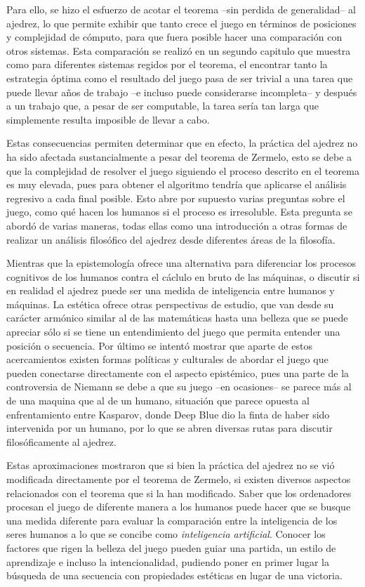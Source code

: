 \documentclass[twoside,openright,12pt,a4paper,spanish]{book}
\begin{document}
Para ello, se hizo el esfuerzo de acotar el teorema --sin perdida de generalidad-- al ajedrez, lo que permite exhibir que tanto crece el juego en t\'erminos de posiciones y complejidad de c\'omputo, para que fuera posible hacer una comparaci\'on con otros sistemas. Esta comparaci\'on se realiz\'o en un segundo capitulo que muestra como para diferentes sistemas regidos por el teorema, el encontrar tanto la estrategia \'optima como el resultado del juego pasa de ser trivial a una tarea que puede llevar a\~nos de trabajo --e incluso puede considerarse incompleta-- y despu\'es a un trabajo que, a pesar de ser computable, la tarea ser\'ia tan larga que simplemente resulta imposible de llevar a cabo.

Estas consecuencias permiten determinar que en efecto, la pr\'actica del ajedrez no ha sido afectada sustancialmente a pesar del teorema de Zermelo, esto se debe a que la complejidad de resolver el juego siguiendo el proceso descrito en el teorema es muy elevada, pues para obtener el algoritmo tendría que aplicarse el análisis regresivo a cada final posible. Esto abre por supuesto varias preguntas sobre el juego, como qu\'e hacen los humanos si el proceso es irresoluble. Esta pregunta se abord\'o de varias maneras, todas ellas como una introducci\'on a otras formas de realizar un an\'alisis filos\'ofico del ajedrez desde diferentes \'areas de la filosof\'ia.

Mientras que la epistemolog\'ia ofrece una alternativa para diferenciar los procesos cognitivos de los humanos contra el c\'aclulo en bruto de las máquinas, o discutir si en realidad el ajedrez puede ser una medida de inteligencia entre humanos y máquinas. La est\'etica ofrece otras perspectivas de estudio, que van desde su car\'acter arm\'onico similar al de las matem\'aticas hasta una belleza que se puede apreciar s\'olo si se tiene un entendimiento del juego que permita entender una posici\'on o secuencia. Por \'ultimo se intent\'o mostrar que aparte de estos acercamientos existen formas pol\'iticas y culturales de abordar el juego que pueden conectarse directamente con el aspecto epist\'emico, pues una parte de la controversia de Niemann se debe a que su juego --en ocasiones-- se parece m\'as al de una maquina que al de un humano, situaci\'on que parece opuesta al enfrentamiento entre Kasparov, donde Deep Blue dio la finta de haber sido intervenida por un humano, por lo que se abren diversas rutas para discutir filos\'oficamente al ajedrez.

Estas aproximaciones mostraron que si bien la pr\'actica del ajedrez no se vi\'o modificada directamente por el teorema de Zermelo, si existen diversos aspectos relacionados con el teorema que si la han modificado. Saber que los ordenadores procesan el juego de diferente manera a los humanos puede hacer que se busque una medida diferente para evaluar la comparaci\'on entre la inteligencia de los seres humanos a lo que se concibe como \emph{inteligencia artificial}. Conocer los factores que rigen la belleza del juego pueden guiar una partida, un estilo de aprendizaje e incluso la intencionalidad, pudiendo poner en primer lugar la búsqueda de una secuencia con propiedades est\'eticas en lugar de una victoria.
\end{document}
